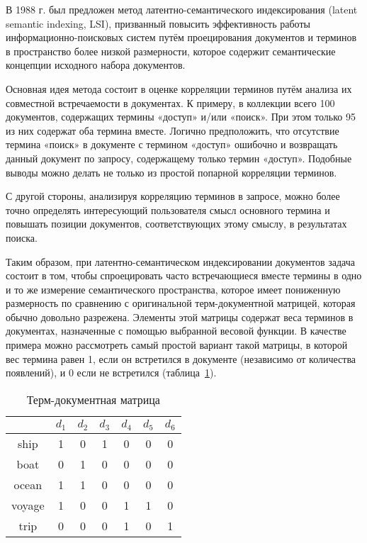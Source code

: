 В 1988 г. был предложен метод латентно-семантического индексирования (latent semantic indexing, LSI), призванный повысить эффективность работы информационно-поисковых систем путём проецирования документов и терминов в пространство более низкой размерности, которое содержит семантические концепции исходного набора документов. 

Основная идея метода состоит в оценке корреляции терминов путём анализа их совместной встречаемости в документах. К примеру, в коллекции всего 100 документов, содержащих термины «доступ» \mbox{и/или} «поиск». При этом только 95 из них содержат оба термина вместе. Логично предположить, что отсутствие термина «поиск» в документе с термином «доступ» ошибочно и возвращать данный документ по запросу, содержащему только термин «доступ». Подобные выводы можно делать не только из простой попарной корреляции терминов. 

С другой стороны, анализируя корреляцию терминов в запросе, можно более точно определять интересующий пользователя смысл основного термина и повышать позиции документов, соответствующих этому смыслу, в результатах поиска.
 
Таким образом, при латентно-семантическом индексировании документов задача состоит в том, чтобы спроецировать часто встречающиеся вместе термины в одно и то же измерение семантического пространства, которое имеет пониженную размерность по сравнению с оригинальной терм-документной матрицей, которая обычно довольно разрежена. Элементы этой матрицы содержат веса терминов в документах, назначенные с помощью выбранной весовой функции. В качестве примера можно рассмотреть самый простой вариант такой матрицы, в которой вес термина равен 1, если он встретился в документе (независимо от количества появлений), и 0 если не встретился (таблица~\ref{td_matr}).
 
\begin{table}[h]
\caption{Терм-документная матрица}
\label{td_matr}
\centering
\begin{tabular}{c|cccccc}
 & $d_1$ & $d_2$ & $d_3$ & $d_4$ & $d_5$ & $d_6$ \\
\hline
ship & 1 & 0 & 1 & 0 & 0 & 0 \\
boat & 0 & 1 & 0 & 0 & 0 & 0 \\
ocean & 1 & 1 & 0 & 0 & 0 & 0 \\
voyage & 1 & 0 & 0 & 1 & 1 & 0 \\
trip & 0 & 0 & 0 & 1 & 0 & 1 \\
\end{tabular}
\end{table}

